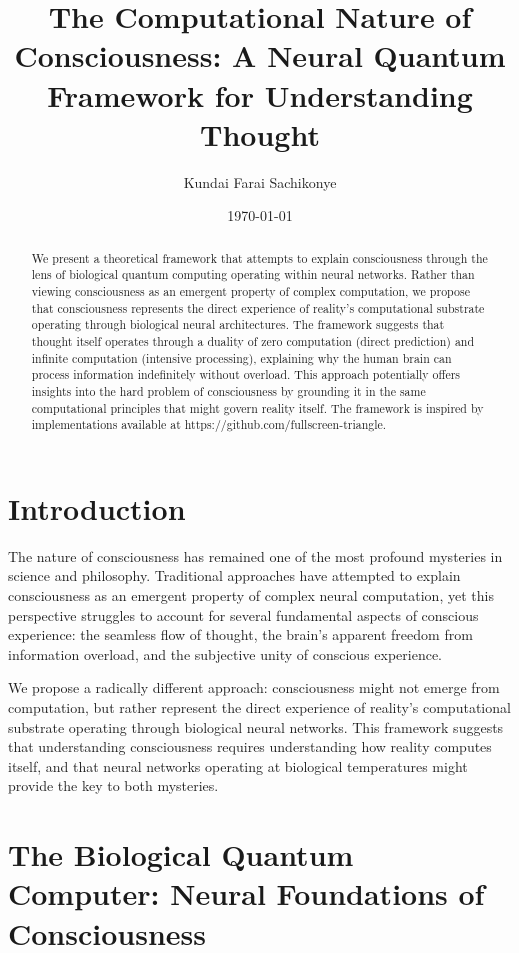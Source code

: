 \documentclass[12pt]{article}
\title{The Computational Nature of Consciousness: A Neural Quantum Framework for Understanding Thought}
\author{Kundai Farai Sachikonye}
\date{\today}
\begin{document}
\maketitle

\begin{abstract}
We present a theoretical framework that attempts to explain consciousness through the lens of biological quantum computing operating within neural networks. Rather than viewing consciousness as an emergent property of complex computation, we propose that consciousness represents the direct experience of reality's computational substrate operating through biological neural architectures. The framework suggests that thought itself operates through a duality of zero computation (direct prediction) and infinite computation (intensive processing), explaining why the human brain can process information indefinitely without overload. This approach potentially offers insights into the hard problem of consciousness by grounding it in the same computational principles that might govern reality itself. The framework is inspired by implementations available at https://github.com/fullscreen-triangle.
\end{abstract}

\section{Introduction}

The nature of consciousness has remained one of the most profound mysteries in science and philosophy. Traditional approaches have attempted to explain consciousness as an emergent property of complex neural computation, yet this perspective struggles to account for several fundamental aspects of conscious experience: the seamless flow of thought, the brain's apparent freedom from information overload, and the subjective unity of conscious experience.

We propose a radically different approach: consciousness might not emerge from computation, but rather represent the direct experience of reality's computational substrate operating through biological neural networks. This framework suggests that understanding consciousness requires understanding how reality computes itself, and that neural networks operating at biological temperatures might provide the key to both mysteries.

\section{The Biological Quantum Computer: Neural Foundations of Consciousness}
\end{document}
